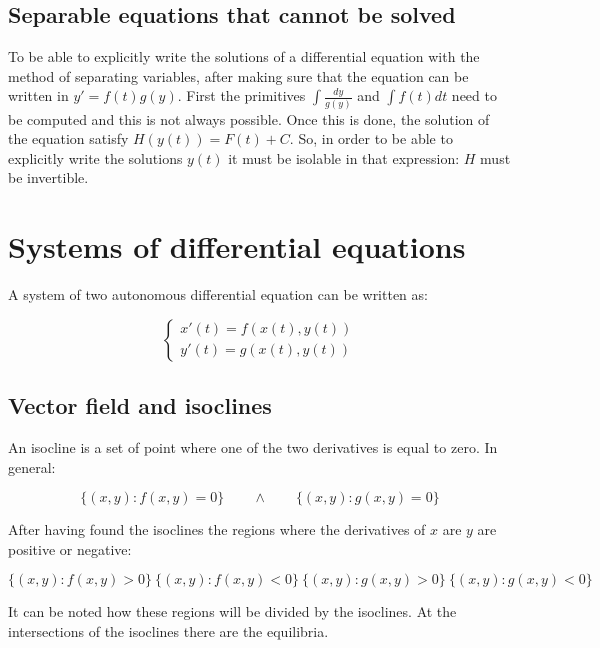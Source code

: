 	\subsection{Separable equations that cannot be solved}
	To be able to explicitly write the solutions of a differential equation with the method of separating variables, after making sure that the equation can be written in $y' = f(t)g(y)$.
	First the primitives $\int\frac{dy}{g(y)}$ and $\int f(t)dt$ need to be computed and this is not always possible.
	Once this is done, the solution of the equation satisfy $H(y(t)) = F(t)+C$.
	So, in order to be able to explicitly write the solutions $y(t)$ it must be isolable in that expression: $H$ must be invertible.

\section{Systems of differential equations}
A system of two autonomous differential equation can be written as:

$$\begin{cases}x'(t) = f(x(t), y(t))\\y'(t)=g(x(t), y(t))\end{cases}$$

	\subsection{Vector field and isoclines}
	An isocline is a set of point where one of the two derivatives is equal to zero.
	In general:

	$$\{(x,y):f(x,y) = 0\}\qquad\land\qquad\{(x,y):g(x,y) = 0\}$$

	After having found the isoclines the regions where the derivatives  of $x$ are $y$ are positive or negative:

	$$\{(x,y):f(x,y)>0\}\ \{(x,y):f(x,y)<0\}\ \{(x,y):g(x,y)>0\}\ \{(x,y):g(x,y)<0\}$$

	It can be noted how these regions will be divided by the isoclines.
	At the intersections of the isoclines there are the equilibria.
